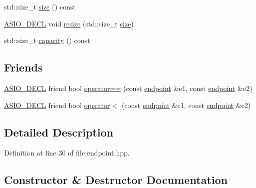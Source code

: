 \begin{DoxyCompactItemize}
\item 
std\+::size\+\_\+t \hyperlink{classasio_1_1generic_1_1detail_1_1endpoint_a30bffb13de4c7d604531a71c25544d66}{size} () const 
\item 
\hyperlink{config_8hpp_ab54d01ea04afeb9a8b39cfac467656b7}{A\+S\+I\+O\+\_\+\+D\+E\+C\+L} void \hyperlink{classasio_1_1generic_1_1detail_1_1endpoint_a940b82f98455f272278939cb6327bcf1}{resize} (std\+::size\+\_\+t \hyperlink{classasio_1_1generic_1_1detail_1_1endpoint_a30bffb13de4c7d604531a71c25544d66}{size})
\item 
std\+::size\+\_\+t \hyperlink{classasio_1_1generic_1_1detail_1_1endpoint_a996c45fdaa15238eb856f481031a0625}{capacity} () const 
\end{DoxyCompactItemize}
\subsection*{Friends}
\begin{DoxyCompactItemize}
\item 
\hyperlink{config_8hpp_ab54d01ea04afeb9a8b39cfac467656b7}{A\+S\+I\+O\+\_\+\+D\+E\+C\+L} friend bool \hyperlink{classasio_1_1generic_1_1detail_1_1endpoint_aede125e94d7da4445025c9927de4a563}{operator==} (const \hyperlink{classasio_1_1generic_1_1detail_1_1endpoint}{endpoint} \&e1, const \hyperlink{classasio_1_1generic_1_1detail_1_1endpoint}{endpoint} \&e2)
\item 
\hyperlink{config_8hpp_ab54d01ea04afeb9a8b39cfac467656b7}{A\+S\+I\+O\+\_\+\+D\+E\+C\+L} friend bool \hyperlink{classasio_1_1generic_1_1detail_1_1endpoint_a7fb7f83bbfa9b04409156faa61c8089d}{operator$<$} (const \hyperlink{classasio_1_1generic_1_1detail_1_1endpoint}{endpoint} \&e1, const \hyperlink{classasio_1_1generic_1_1detail_1_1endpoint}{endpoint} \&e2)
\end{DoxyCompactItemize}


\subsection{Detailed Description}


Definition at line 30 of file endpoint.\+hpp.



\subsection{Constructor \& Destructor Documentation}
\hypertarget{classasio_1_1generic_1_1detail_1_1endpoint_ac9e985f6a6d064dd86cfb3555dee811f}{}
